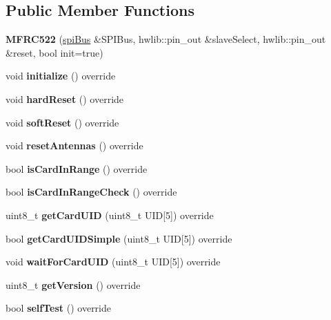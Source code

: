 \subsection*{Public Member Functions}
\begin{DoxyCompactItemize}
\item 
\mbox{\label{class_m_f_r_c522_a70e6c463aec08918c71c2e0c77742b4b}} 
{\bfseries M\+F\+R\+C522} (\mbox{\hyperlink{classspi_bus}{spi\+Bus}} \&S\+P\+I\+Bus, hwlib\+::pin\+\_\+out \&slave\+Select, hwlib\+::pin\+\_\+out \&reset, bool init=true)
\item 
\mbox{\label{class_m_f_r_c522_a5f589b09eaf150551b369052ce125fa1}} 
void {\bfseries initialize} () override
\item 
\mbox{\label{class_m_f_r_c522_a016df9ed0421397c634cc79c475dbe3b}} 
void {\bfseries hard\+Reset} () override
\item 
\mbox{\label{class_m_f_r_c522_ae51e1e0bee2b7a65d6314bfb48121f1d}} 
void {\bfseries soft\+Reset} () override
\item 
\mbox{\label{class_m_f_r_c522_ac981022cc3ae79f727b2365e309cf691}} 
void {\bfseries reset\+Antennas} () override
\item 
\mbox{\label{class_m_f_r_c522_a019f76569bddf9c2f9f94eca13a618d7}} 
bool {\bfseries is\+Card\+In\+Range} () override
\item 
\mbox{\label{class_m_f_r_c522_a29ce0dd04495f9352e32ada5ecc5fd03}} 
bool {\bfseries is\+Card\+In\+Range\+Check} () override
\item 
\mbox{\label{class_m_f_r_c522_ad3c7ab4c70988e80c400f36f724a12b7}} 
uint8\+\_\+t {\bfseries get\+Card\+U\+ID} (uint8\+\_\+t U\+ID\mbox{[}5\mbox{]}) override
\item 
\mbox{\label{class_m_f_r_c522_a33c20be6030f635d986984db4999a1eb}} 
bool {\bfseries get\+Card\+U\+I\+D\+Simple} (uint8\+\_\+t U\+ID\mbox{[}5\mbox{]}) override
\item 
\mbox{\label{class_m_f_r_c522_aeb05c83c2d139eb2c57f400399982691}} 
void {\bfseries wait\+For\+Card\+U\+ID} (uint8\+\_\+t U\+ID\mbox{[}5\mbox{]}) override
\item 
\mbox{\label{class_m_f_r_c522_a25fb0a50bf7db51ab9c5bc2ff4fa84e3}} 
uint8\+\_\+t {\bfseries get\+Version} () override
\item 
\mbox{\label{class_m_f_r_c522_adcc4f5eb212c1a94e462eab459bd685e}} 
bool {\bfseries self\+Test} () override
\end{DoxyCompactItemize}

